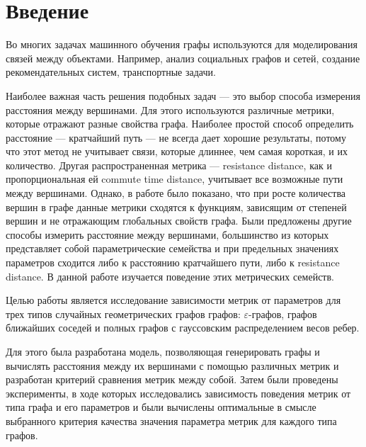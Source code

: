 \chapter*{Введение}							%

Во многих задачах машинного обучения графы используются для моделирования связей между объектами. Например, анализ социальных графов и сетей, создание рекомендательных систем, транспортные задачи.

Наиболее важная часть решения подобных задач --- это выбор способа измерения расстояния между вершинами. Для этого используются различные метрики, которые отражают разные свойства графа. Наиболее простой способ определить расстояние --- кратчайший путь --- не всегда дает хорошие результаты, потому что этот метод не учитывает связи, которые длиннее, чем самая короткая, и их количество. Другая распространенная метрика --- resistance distance, как и пропорциональная ей commute time distance, учитывает все возможные пути между вершинами. Однако, в работе \cite{von2014hitting} было показано, что при росте количества вершин в графе данные метрики сходятся к функциям, зависящим от степеней вершин и не отражающим глобальных свойств графа. Были предложены другие способы измерить расстояние между вершинами, большинство из которых представляет собой параметрические семейства и при предельных значениях параметров сходится либо к расстоянию кратчайшего пути, либо к resistance distance. В данной работе изучается поведение этих метрических семейств.

Целью работы является исследование зависимости метрик от параметров для трех типов случайных геометрических графов графов:  $\varepsilon$-графов, графов ближайших соседей и полных графов с гауссовским распределением весов ребер.

Для этого была разработана модель, позволяющая генерировать графы и вычислять расстояния между их вершинами с помощью различных метрик и разработан критерий сравнения метрик между собой. Затем были проведены эксперименты, в ходе которых исследовались зависимость поведения метрик от типа графа и его параметров и были вычислены оптимальные в смысле выбранного критерия качества значения параметра метрик для каждого типа графов.


\clearpage